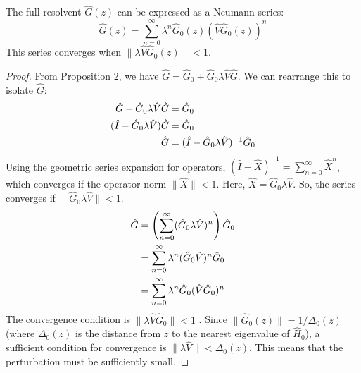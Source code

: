 \begin{theorem}
    The full resolvent $\hat G(z)$ can be expressed as a Neumann series:
    \begin{equation} \label{eq:neumann_series_resolvent}
        \hat G(z) = \sum_{n=0}^\infty \lambda^n \hat G_0(z) (\hat V
        \hat G_0(z))^n
    \end{equation}
    This series converges when $\|\lambda \hat V \hat G_0(z)\| < 1$.
\end{theorem}
\begin{proof}
    From Proposition 2, we have $\hat G = \hat G_0 + \hat G_0
    \lambda \hat V \hat G$. We can rearrange this to isolate $\hat G$:
    \begin{align}
        \hat G - \hat G_0 \lambda \hat V \hat G &= \hat G_0 \\
        (\hat I - \hat G_0 \lambda \hat V) \hat G &= \hat G_0 \notag \\
        \hat G &= (\hat I - \hat G_0 \lambda \hat V)^{-1} \hat G_0 \notag
    \end{align}
    Using the geometric series expansion for operators, $(\hat I -
    \hat X)^{-1} = \sum_{n=0}^\infty \hat X^n$, which converges if
    the operator norm $\|\hat X\| < 1$. Here, $\hat X = \hat G_0
    \lambda \hat V$. So, the series converges if $\|\hat G_0 \lambda
    \hat V\| < 1$.
    \begin{align} \label{eq:neumann_series_derivation}
        \hat G &= \left( \sum_{n=0}^\infty (\hat G_0 \lambda \hat
        V)^n \right) \hat G_0 \\
        &= \sum_{n=0}^\infty \lambda^n (\hat G_0 \hat V)^n \hat G_0 \notag \\
        &= \sum_{n=0}^\infty \lambda^n \hat G_0 (\hat V \hat G_0)^n \notag
    \end{align}
    The convergence condition is $\|\lambda \hat V \hat G_0\| < 1$
    . Since $\|\hat G_0(z)\|=1/\Delta_0(z)$ (where
        $\Delta_0(z)$ is the distance from $z$ to the nearest eigenvalue
    of $\hat H_0$), a sufficient condition for convergence is
    $\|\lambda \hat V\| < \Delta_0(z)$. This means that the
    perturbation must be sufficiently small.
\end{proof}

